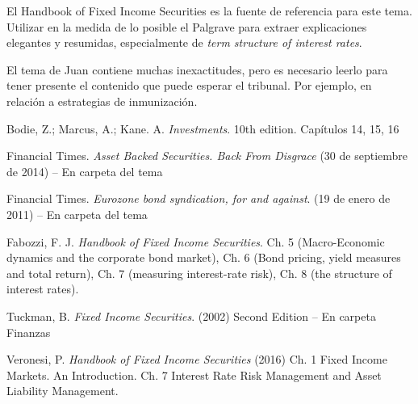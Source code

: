 \documentclass{nuevotema}
\begin{document}
El Handbook of Fixed Income Securities es la fuente de referencia para este tema. Utilizar en la medida de lo posible el Palgrave para extraer explicaciones elegantes y resumidas, especialmente de \textit{term structure of interest rates}.

El tema de Juan contiene muchas inexactitudes, pero es necesario leerlo para tener presente el contenido que puede esperar el tribunal. Por ejemplo, en relación a estrategias de inmunización.

\bibliografia

Bodie, Z.; Marcus, A.; Kane. A. \textit{Investments}. 10th edition. Capítulos 14, 15, 16

Financial Times. \textit{Asset Backed Securities. Back From Disgrace} (30 de septiembre de 2014) -- En carpeta del tema

Financial Times. \textit{Eurozone bond syndication, for and against}. (19 de enero de 2011) -- En carpeta del tema

Fabozzi, F. J. \textit{Handbook of Fixed Income Securities}.  Ch. 5 (Macro-Economic dynamics and the corporate bond market), Ch. 6 (Bond pricing, yield measures and total return), Ch. 7 (measuring interest-rate risk), Ch. 8 (the structure of interest rates).

Tuckman, B. \textit{Fixed Income Securities}. (2002) Second Edition -- En carpeta Finanzas

Veronesi, P. \textit{Handbook of Fixed Income Securities} (2016) Ch. 1 Fixed Income Markets. An Introduction. Ch. 7 Interest Rate Risk Management and Asset Liability Management.
\end{document}
